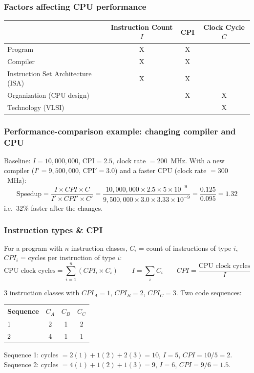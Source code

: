 \subsubsection{Factors affecting CPU performance}
\begin{center}
\begin{tabular}{@{}lccc@{}}
\toprule
 & Instruction Count $I$ & CPI & Clock Cycle $C$ \\
\midrule
Program                              & X & X &   \\
Compiler                             & X & X &   \\
Instruction Set Architecture (ISA)   & X & X &   \\
Organization (CPU design)            &   & X & X \\
Technology (VLSI)                    &   &   & X \\
\bottomrule
\end{tabular}
\end{center}

\subsubsection{Performance-comparison example: changing compiler and CPU}
\begin{eg}
Baseline: $I=10{,}000{,}000$, CPI$=2.5$, clock rate $=200$~MHz. With a new
compiler ($I'=9{,}500{,}000$, CPI$'=3.0$) and a faster CPU (clock rate
$=300$~MHz):
\[
  \text{Speedup} = \frac{I \times CPI \times C}{I' \times CPI' \times C'}
  = \frac{10{,}000{,}000\times2.5\times5\times10^{-9}}
         {9{,}500{,}000\times3.0\times3.33\times10^{-9}}
  = \frac{0.125}{0.095} = 1.32
\]
i.e.\ 32\% faster after the changes.
\end{eg}

\subsubsection{Instruction types \& CPI}
\begin{prop}
For a program with $n$ instruction classes, $C_i$ = count of instructions of
type $i$, $CPI_i$ = cycles per instruction of type $i$:
\[
  \text{CPU clock cycles} = \sum_{i=1}^{n} \left(CPI_i \times C_i\right)
  \qquad I = \sum_i C_i \qquad CPI = \frac{\text{CPU clock cycles}}{I}
\]
\end{prop}

\begin{eg}
3 instruction classes with $CPI_A=1$, $CPI_B=2$, $CPI_C=3$. Two code
sequences:
\begin{center}
\begin{tabular}{@{}lccc@{}}
\toprule
Sequence & $C_A$ & $C_B$ & $C_C$ \\
\midrule
1 & 2 & 1 & 2 \\
2 & 4 & 1 & 1 \\
\bottomrule
\end{tabular}
\end{center}
Sequence 1: cycles $=2(1)+1(2)+2(3)=10$, $I=5$, $CPI=10/5=2$.
Sequence 2: cycles $=4(1)+1(2)+1(3)=9$, $I=6$, $CPI=9/6=1.5$.
\end{eg}

